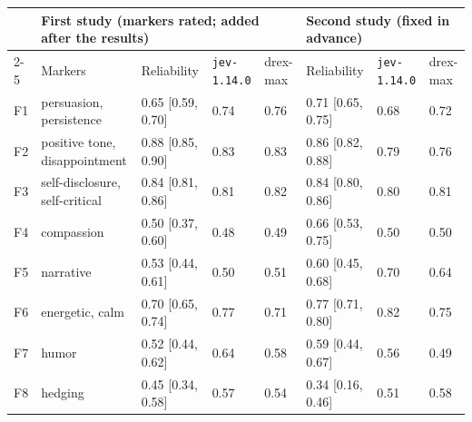 {\scriptsize\setlength{\tabcolsep}{3.5pt}
\begin{tabular}{@{}l l l l l l l l@{}}
\toprule
 & \multicolumn{4}{l}{First study (markers rated; added after the results)} & \multicolumn{3}{l}{Second study (fixed in advance)} \\
\cmidrule(r){2-5}\cmidrule{6-8}
 & Markers & Reliability & \texttt{jev-1.14.0} & drex-max & Reliability & \texttt{jev-1.14.0} & drex-max \\
\midrule
F1 & persuasion, persistence & 0.65 {\scriptsize[0.59, 0.70]} & 0.74 & 0.76 & 0.71 {\scriptsize[0.65, 0.75]} & 0.68 & 0.72 \\
F2 & positive tone, disappointment & 0.88 {\scriptsize[0.85, 0.90]} & 0.83 & 0.83 & 0.86 {\scriptsize[0.82, 0.88]} & 0.79 & 0.76 \\
F3 & self-disclosure, self-critical & 0.84 {\scriptsize[0.81, 0.86]} & 0.81 & 0.82 & 0.84 {\scriptsize[0.80, 0.86]} & 0.80 & 0.81 \\
F4 & compassion & 0.50 {\scriptsize[0.37, 0.60]} & 0.48 & 0.49 & 0.66 {\scriptsize[0.53, 0.75]} & 0.50 & 0.50 \\
F5 & narrative & 0.53 {\scriptsize[0.44, 0.61]} & 0.50 & 0.51 & 0.60 {\scriptsize[0.45, 0.68]} & 0.70 & 0.64 \\
F6 & energetic, calm & 0.70 {\scriptsize[0.65, 0.74]} & 0.77 & 0.71 & 0.77 {\scriptsize[0.71, 0.80]} & 0.82 & 0.75 \\
F7 & humor & 0.52 {\scriptsize[0.44, 0.62]} & 0.64 & 0.58 & 0.59 {\scriptsize[0.44, 0.67]} & 0.56 & 0.49 \\
F8 & hedging & 0.45 {\scriptsize[0.34, 0.58]} & 0.57 & 0.54 & 0.34 {\scriptsize[0.16, 0.46]} & 0.51 & 0.58 \\
\bottomrule
\end{tabular}}
